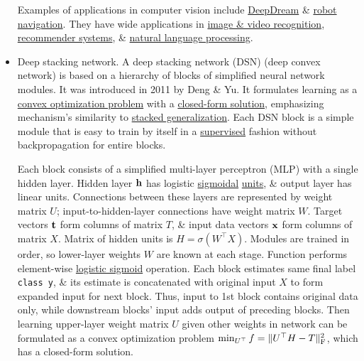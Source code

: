 \documentclass{article}
\begin{document}
\begin{itemize}
	Examples of applications in computer vision include \href{https://en.wikipedia.org/wiki/DeepDream}{DeepDream} \& \href{https://en.wikipedia.org/wiki/Robot_navigation}{robot navigation}. They have wide applications in \href{https://en.wikipedia.org/wiki/Computer_vision}{image \& video recognition}, \href{https://en.wikipedia.org/wiki/Recommender_system}{recommender systems}, \& \href{https://en.wikipedia.org/wiki/Natural_language_processing}{natural language processing}.
	\item {\sf Deep stacking network.} A deep stacking network (DSN) (deep convex network) is based on a hierarchy of blocks of simplified neural network modules. It was introduced in 2011 by Deng \& Yu. It formulates learning as a \href{https://en.wikipedia.org/wiki/Convex_optimization_problem}{convex optimization problem} with a \href{https://en.wikipedia.org/wiki/Closed-form_expression}{closed-form solution}, emphasizing mechanism's similarity to \href{https://en.wikipedia.org/wiki/Ensemble_learning}{stacked generalization}. Each DSN block is a simple module that is easy to train by itself in a \href{https://en.wikipedia.org/wiki/Supervised_learning}{supervised} fashion without backpropagation for entire blocks.
	
	Each block consists of a simplified multi-layer perceptron (MLP) with a single hidden layer. Hidden layer ${\bf h}$ has logistic \href{https://en.wikipedia.org/wiki/Sigmoid_function}{sigmoidal} \href{https://en.wikipedia.org/wiki/Artificial_neuron}{units}, \& output layer has linear units. Connections between these layers are represented by weight matrix $U$; input-to-hidden-layer connections have weight matrix $W$. Target vectors ${\bf t}$ form columns of matrix $T$, \& input data vectors ${\bf x}$ form columns of matrix $X$. Matrix of hidden units is $H = \sigma(W^\top X)$. Modules are trained in order, so lower-layer weights $W$ are known at each stage. Function performs element-wise \href{https://en.wikipedia.org/wiki/Logistic_function}{logistic sigmoid} operation. Each block estimates same final label {\tt class y}, \& its estimate is concatenated with original input $X$ to form expanded input for next block. Thus, input to 1st block contains original data only, while downstream blocks' input adds output of preceding blocks. Then learning upper-layer weight matrix $U$ given other weights in network can be formulated as a convex optimization problem $\min_{U^\top} f = \|U^\top H - T\|_{\rm F}^2$, which has a closed-form solution.
	

\end{itemize}
\end{document}
